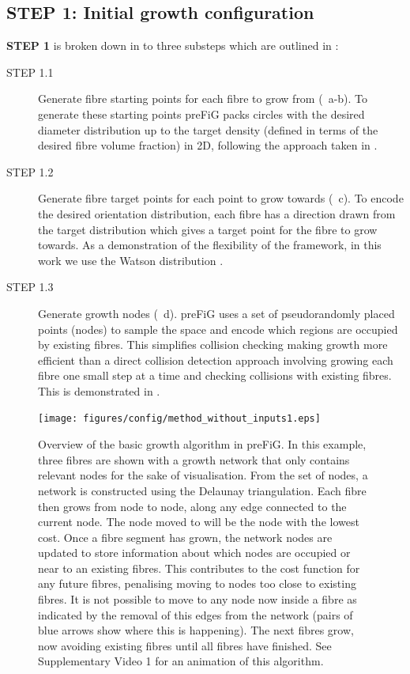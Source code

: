 \subsection{STEP 1: Initial growth configuration}
\label{sec:ipmi_step1_details}
\textbf{\sffamily STEP 1} is broken down in to three substeps which are outlined in :
\begin{description}
  \item [STEP 1.1] Generate fibre starting points for each fibre to grow from (~a-b). To generate these starting points \ac{preFiG} packs circles with the desired diameter distribution up to the target density (defined in terms of the desired fibre volume fraction) in 2D, following the approach taken in \cite{Hall2009}.

  \item [STEP 1.2] Generate fibre target points for each point to grow towards (~c). To encode the desired orientation distribution, each fibre has a direction drawn from the target distribution which gives a target point for the fibre to grow towards. As a demonstration of the flexibility of the framework, in this work we use the Watson distribution \cite{Mardia2008}.

  \item [STEP 1.3] Generate growth nodes (~d). \ac{preFiG} uses a set of pseudorandomly placed points (nodes) to sample the space and encode which regions are occupied by existing fibres. This simplifies collision checking making growth more efficient than a direct collision detection approach involving growing each fibre one small step at a time and checking collisions with existing fibres. This is demonstrated in .
\end{description}

\begin{figure}[h!]
  \centering
  \texttt{[image: figures/config/method\_without\_inputs1.eps]}
  \caption[Overview of the \ac{preFiG} growth algorithm]{Overview of the basic growth algorithm in \ac{preFiG}. In this example, three fibres are shown with a growth network that only contains relevant nodes for the sake of visualisation.  From the set of nodes, a network is constructed using the Delaunay triangulation. Each fibre then grows from node to node, along any edge connected to the current node. The node moved to will be the node with the lowest cost. Once a fibre segment has grown, the network nodes are updated to store information about which nodes are occupied or near to an existing fibres. This contributes to the cost function for any future fibres, penalising moving to nodes too close to existing fibres.  It is not possible to move to any node now inside a fibre as indicated by the removal of this edges from the network (pairs of blue arrows show where this is happening). The next fibres grow, now avoiding existing fibres until all fibres have finished. See Supplementary Video 1 for an animation of this algorithm. }
  \label{fig:ipmi_config_algorithm}
\end{figure}

